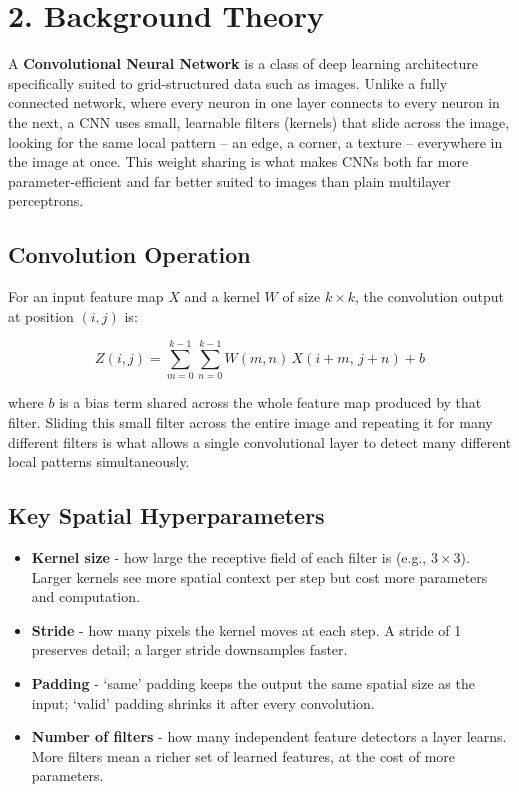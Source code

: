 \documentclass[11pt]{article}
\begin{document}
\section*{2. Background Theory}

A \textbf{Convolutional Neural Network} is a class of deep learning architecture specifically suited to grid-structured data such as images. Unlike a fully connected network, where every neuron in one layer connects to every neuron in the next, a CNN uses small, learnable filters (kernels) that slide across the image, looking for the same local pattern -- an edge, a corner, a texture -- everywhere in the image at once. This weight sharing is what makes CNNs both far more parameter-efficient and far better suited to images than plain multilayer perceptrons.

\subsection*{Convolution Operation}

For an input feature map $X$ and a kernel $W$ of size $k \times k$, the convolution output at position $(i,j)$ is:

\[
Z(i,j) = \sum_{m=0}^{k-1}\sum_{n=0}^{k-1} W(m,n)\, X(i+m,\, j+n) + b
\]

where $b$ is a bias term shared across the whole feature map produced by that filter. Sliding this small filter across the entire image and repeating it for many different filters is what allows a single convolutional layer to detect many different local patterns simultaneously.

\subsection*{Key Spatial Hyperparameters}

\begin{itemize}
\item \textbf{Kernel size} - how large the receptive field of each filter is (e.g., $3\times3$). Larger kernels see more spatial context per step but cost more parameters and computation.
\item \textbf{Stride} - how many pixels the kernel moves at each step. A stride of 1 preserves detail; a larger stride downsamples faster.
\item \textbf{Padding} - `same' padding keeps the output the same spatial size as the input; `valid' padding shrinks it after every convolution.
\item \textbf{Number of filters} - how many independent feature detectors a layer learns. More filters mean a richer set of learned features, at the cost of more parameters.
\end{itemize}
\end{document}

